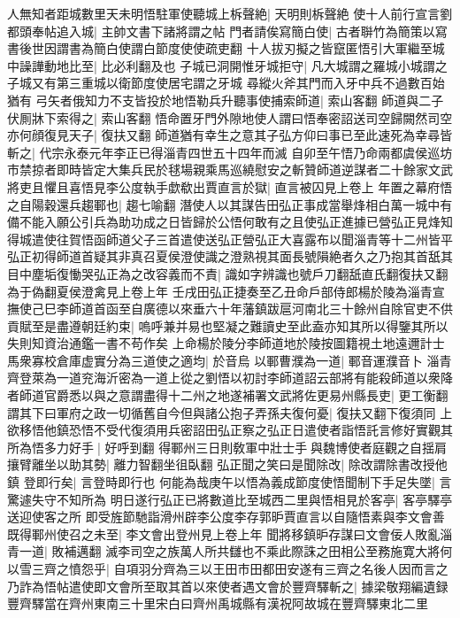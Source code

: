 人無知者距城數里天未明悟駐軍使聽城上柝聲絶|{
	天明則柝聲絶}
使十人前行宣言劉都頭奉帖追入城|{
	主帥文書下諸將謂之帖}
門者請俟寫簡白使|{
	古者聨竹為簡策以寫書後世因謂書為簡白使謂白節度使使疏吏翻}
十人拔刃擬之皆竄匿悟引大軍繼至城中譟譁動地比至|{
	比必利翻及也}
子城已洞開惟牙城拒守|{
	凡大城謂之羅城小城謂之子城又有第三重城以衛節度使居宅謂之牙城}
尋縱火斧其門而入牙中兵不過數百始猶有弓矢者俄知力不支皆投於地悟勒兵升聽事使捕索師道|{
	索山客翻}
師道與二子伏厠牀下索得之|{
	索山客翻}
悟命置牙門外隙地使人謂曰悟奉密詔送司空歸闕然司空亦何顔復見天子|{
	復扶又翻}
師道猶有幸生之意其子弘方仰曰事已至此速死為幸尋皆斬之|{
	代宗永泰元年李正已得淄青四世五十四年而滅}
自卯至午悟乃命兩都虞侯巡坊市禁掠者即時皆定大集兵民於毬場親乘馬巡繞慰安之斬贊師道逆謀者二十餘家文武將吏且懼且喜悟見李公度執手歔欷出賈直言於獄|{
	直言被囚見上卷上}
年置之幕府悟之自陽穀還兵趨鄆也|{
	趨七喻翻}
潛使人以其謀告田弘正事成當舉烽相白萬一城中有備不能入願公引兵為助功成之日皆歸於公悟何敢有之且使弘正進據已營弘正見烽知得城遣使往賀悟函師道父子三首遣使送弘正營弘正大喜露布以聞淄青等十二州皆平弘正初得師道首疑其非真召夏侯澄使識之澄熟視其面長號隕絶者久之乃抱其首舐其目中塵垢復慟哭弘正為之改容義而不責|{
	識如字辨識也號戶刀翻舐直氏翻復扶又翻為于偽翻夏侯澄禽見上卷上年}
壬戌田弘正捷奏至乙丑命戶部侍郎楊於陵為淄青宣撫使己巳李師道首函至自廣德以來垂六十年藩鎮跋扈河南北三十餘州自除官吏不供貢賦至是盡遵朝廷約束|{
	嗚呼兼并易也堅凝之難讀史至此盍亦知其所以得鑒其所以失則知資治通鑑一書不苟作矣}
上命楊於陵分李師道地於陵按圖籍視土地遠邇計士馬衆寡校倉庫虚實分為三道使之適均|{
	於音烏}
以鄆曹濮為一道|{
	鄆音運濮音卜}
淄青齊登萊為一道兖海沂密為一道上從之劉悟以初討李師道詔云部將有能殺師道以衆降者師道官爵悉以與之意謂盡得十二州之地遂補署文武將佐更易州縣長吏|{
	更工衡翻}
謂其下曰軍府之政一切循舊自今但與諸公抱子弄孫夫復何憂|{
	復扶又翻下復須同}
上欲移悟他鎮恐悟不受代復須用兵密詔田弘正察之弘正日遣使者詣悟託言修好實觀其所為悟多力好手|{
	好呼到翻}
得鄆州三日則敎軍中壯士手與魏博使者庭觀之自揺肩攘臂離坐以助其勢|{
	離力智翻坐徂臥翻}
弘正聞之笑曰是聞除改|{
	除改謂除書改授他鎮}
登即行矣|{
	言登時即行也}
何能為哉庚午以悟為義成節度使悟聞制下手足失墜|{
	言驚遽失守不知所為}
明日遂行弘正已將數道比至城西二里與悟相見於客亭|{
	客亭驛亭送迎使客之所}
即受旌節馳詣滑州辟李公度李存郭昈賈直言以自隨悟素與李文會善既得鄆州使召之未至|{
	李文會出登州見上卷上年}
聞將移鎮昈存謀曰文會佞人敗亂淄青一道|{
	敗補邁翻}
滅李司空之族萬人所共讎也不乘此際誅之田相公至務施寛大將何以雪三齊之憤怨乎|{
	自項羽分齊為三以王田市田都田安遂有三齊之名後人因而言之}
乃詐為悟帖遣使即文會所至取其首以來使者遇文會於豐齊驛斬之|{
	據梁敬翔編遺録豐齊驛當在齊州東南三十里宋白曰齊州禹城縣有漢祝阿故城在豐齊驛東北二里}
